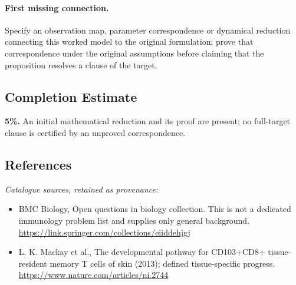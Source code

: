 \documentclass[11pt]{article}
\begin{document}
\paragraph{First missing connection.} Specify an observation map, parameter correspondence or dynamical reduction connecting this worked model to the original formulation; prove that correspondence under the original assumptions before claiming that the proposition resolves a clause of the target.
\subsection{Completion Estimate}
\textbf{5\%.} An initial mathematical reduction and its proof are present; no full-target clause is certified by an unproved correspondence.
\subsection{References}
\noindent\emph{Catalogue sources, retained as provenance:}
\begin{itemize}
\item BMC Biology, Open questions in biology collection. This is not a dedicated immunology problem list and supplies only general background. \url{https://link.springer.com/collections/eiiddehjgj}
\item L. K. Mackay et al., The developmental pathway for CD103+CD8+ tissue-resident memory T cells of skin (2013); defined tissue-specific progress. \url{https://www.nature.com/articles/ni.2744}
\end{itemize}
\end{document}

